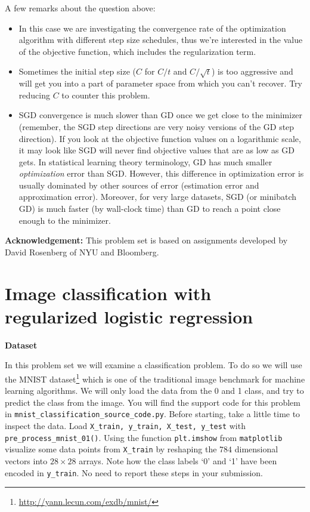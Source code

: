\documentclass{article}
\begin{document}
A few remarks about the question above:
\begin{itemize}
\item In this case we are investigating the convergence rate of
the optimization algorithm with different step size schedules, thus
we're interested in the value of the objective function, which includes
the regularization term.
\item Sometimes the initial step size ($C$
for $C/t$ and $C/\sqrt{t}$) is too aggressive and will get you into
a part of parameter space from which you can't recover. Try reducing $C$ to counter this problem. 
\item SGD
convergence is much slower than GD once we get close to the minimizer
(remember, the SGD step directions are very noisy versions of the
GD step direction). If you look at the objective function values on
a logarithmic scale, it may look like SGD will never find objective
values that are as low as GD gets. In statistical learning theory terminology, GD has much smaller \emph{optimization} error than SGD. However,
this difference in optimization error is usually dominated by other
sources of error (estimation error and approximation error). Moreover,
for very large datasets, SGD (or minibatch GD) is much faster (by
wall-clock time) than GD to reach a point close enough
to the minimizer. 
\end{itemize}

{\bf Acknowledgement:} This problem set is based on assignments developed by David Rosenberg of NYU and Bloomberg.


\section{\large Image classification with regularized logistic regression}


{\color{nyupurple} \large \bf Dataset}  

In this problem set we will examine a classification problem. To do so we will use the MNIST dataset\footnote{\url{http://yann.lecun.com/exdb/mnist/}} which is one of the traditional image benchmark for machine learning algorithms. We will only load the data from the 0 and 1 class, and try to predict the class from the image. You will find the support code for this problem in \texttt{mnist\_classification\_source\_code.py}.
Before starting, take a little time to inspect the data. Load \texttt{X\_train, y\_train, X\_test, y\_test} with \texttt{pre\_process\_mnist\_01()}. Using the function \texttt{plt.imshow} from \texttt{matplotlib} visualize some data points from \texttt{X\_train} by reshaping the $784$ dimensional vectors into $28 \times 28$ arrays. Note how the class labels `0' and `1' have been encoded in \texttt{y\_train}. No need to report these steps in your submission.
\end{document}
